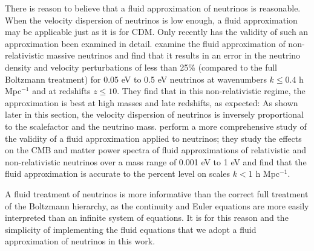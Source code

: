 \documentclass[twocolumn,superscriptaddress,prd]{revtex4}
\begin{document}
There is reason to believe that a fluid approximation of
neutrinos is reasonable. When the velocity dispersion of neutrinos is low enough, a
fluid approximation may be applicable just as it is for CDM. Only recently has the validity of such an approximation been
examined in detail.  \cite{shoji10} examine the fluid approximation
of non-relativistic massive neutrinos and find that it 
results in an error in the neutrino density and
velocity perturbations of less than 25\% (compared to the full
Boltzmann treatment) for 0.05 eV to 0.5 eV neutrinos  at wavenumbers $k \le 0.4$ h
Mpc$^{-1}$ and at
redshifts $z\le10$.  
They find that in this non-relativistic regime,
the approximation is best at high masses and late redshifts, as
expected: As shown later in this section, the velocity dispersion of neutrinos is inversely
proportional to the scalefactor and the neutrino mass. 
\cite{lesgourgues11} perform a more comprehensive study of the
validity of a fluid approximation applied to neutrinos; they study the
effects on the CMB and matter power spectra of 
fluid approximations of relativistic and non-relativistic neutrinos over a mass range of
0.001 eV to 1 eV and find
that the fluid approximation is accurate to the percent level on
scales $k<1$ h Mpc$^{-1}$.  



A fluid treatment of neutrinos is more
informative than the correct full treatment of the Boltzmann
hierarchy, as the continuity and Euler equations are more easily
interpreted than an infinite system of equations.  
It is for this reason and the simplicity of implementing the fluid
equations 
that we adopt a fluid approximation of
neutrinos in this work.  
\end{document}
